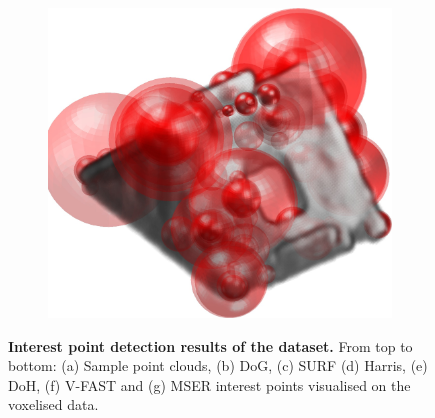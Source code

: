 \begin{figure}[ht]
\begin{subfigure}[t]{1\linewidth}
		\includegraphics[width=0.180\linewidth]{./fig/eval/bracket_mser.jpg} 
	\end{subfigure}
	\caption{\textbf{Interest point detection results of the \stereoset dataset.} From top to bottom: (a) Sample point clouds, (b) DoG, (c) SURF (d) Harris, (e) DoH, (f) V-FAST and (g) MSER interest points visualised on the voxelised data.}
	\label{fig/eval/mvs}
\end{figure}


